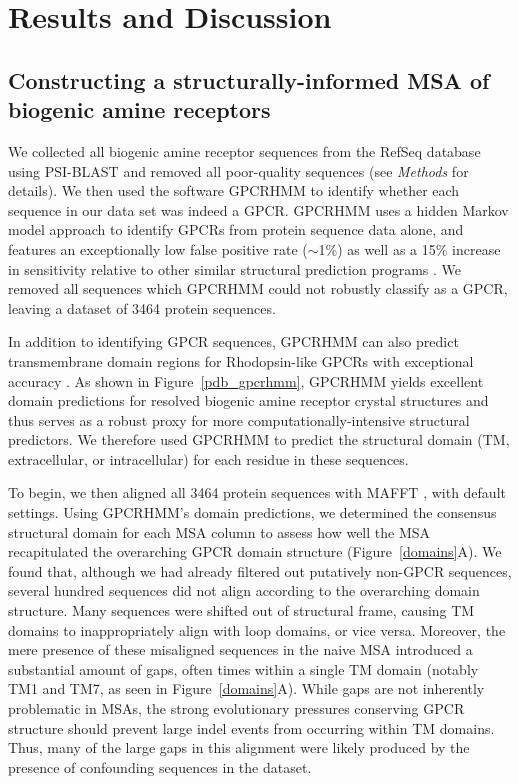 \documentclass[fleqn,10pt]{wlpeerj}
\begin{document}
\section*{Results and Discussion}

\subsection*{Constructing a structurally-informed MSA of biogenic amine receptors}

We collected all biogenic amine receptor sequences from the RefSeq database \citep{refseq} using PSI-BLAST and removed all poor-quality sequences (see \emph{Methods} for details). We then used the software GPCRHMM \citep{Wistrand2006} to identify whether each sequence in our data set was indeed a GPCR. GPCRHMM uses a hidden Markov model approach to identify GPCRs from protein sequence data alone, and features an exceptionally low false positive rate ($\sim$1\%) as well as a 15\% increase in sensitivity relative to other similar structural prediction programs \citep{Wistrand2006}. We removed all sequences which GPCRHMM could not robustly classify as a GPCR, leaving a dataset of 3464 protein sequences. 

In addition to identifying GPCR sequences, GPCRHMM can also predict transmembrane domain regions for Rhodopsin-like GPCRs with exceptional accuracy \citep{SpielmanWilke2013}. As shown in Figure~\ref{pdb_gpcrhmm}, GPCRHMM yields excellent domain predictions for resolved biogenic amine receptor crystal structures and thus serves as a robust proxy for more computationally-intensive structural predictors. We therefore used GPCRHMM to predict the structural domain (TM, extracellular, or intracellular) for each residue in these sequences.

To begin, we then aligned all 3464 protein sequences with MAFFT \citep{mafftv7}, with default settings. Using GPCRHMM's domain predictions, we determined the consensus structural domain for each MSA column to assess how well the MSA recapitulated the overarching GPCR domain structure (Figure~\ref{domains}A). We found that, although we had already filtered out putatively non-GPCR sequences, several hundred sequences did not align according to the overarching domain structure. Many sequences were shifted out of structural frame, causing TM domains to inappropriately align with loop domains, or vice versa. Moreover, the mere presence of these misaligned sequences in the naive MSA introduced a substantial amount of gaps, often times within a single TM domain (notably TM1 and TM7, as seen in Figure~\ref{domains}A). While gaps are not inherently problematic in MSAs, the strong evolutionary pressures conserving GPCR structure should prevent large indel events from occurring within TM domains. Thus, many of the large gaps in this alignment were likely produced by the presence of confounding sequences in the dataset.
\end{document}
